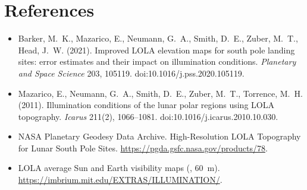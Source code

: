 \section*{References}\label{sec:refs}
\begin{small}\sloppy
\begin{itemize}[leftmargin=1.2em,itemsep=0pt]
\item Barker, M.~K., Mazarico, E., Neumann, G.~A., Smith, D.~E., Zuber, M.~T., Head, J.~W. (2021). Improved LOLA elevation maps for south pole landing sites: error estimates and their impact on illumination conditions. \emph{Planetary and Space Science} 203, 105119. doi:10.1016/j.pss.2020.105119.
\item Mazarico, E., Neumann, G.~A., Smith, D.~E., Zuber, M.~T., Torrence, M.~H. (2011). Illumination conditions of the lunar polar regions using LOLA topography. \emph{Icarus} 211(2), 1066--1081. doi:10.1016/j.icarus.2010.10.030.
\item NASA Planetary Geodesy Data Archive. High-Resolution LOLA Topography for Lunar South Pole Sites. \url{https://pgda.gsfc.nasa.gov/products/78}.
\item LOLA average Sun and Earth visibility maps (, 60~m). \url{https://imbrium.mit.edu/EXTRAS/ILLUMINATION/}.
\end{itemize}
\end{small}


